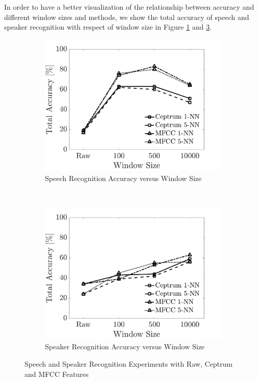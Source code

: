 \documentclass{article}
\begin{document}
	\justify In order to have a better visualization of the relationship between accuracy and different window sizes and methods, we show the total accuracy of speech and speaker recognition with respect of window size in Figure \ref{fig:speech} and \ref{fig:speaker}.
	\begin{figure}[H]
		\centering
		\begin{subfigure}[t]{0.49\textwidth}
			\centering
			\includegraphics[width=\textwidth]{speech_accuracy}
			\caption{Speech Recognition Accuracy versus Window Size}
			\label{fig:speech}
		\end{subfigure}~
		\begin{subfigure}[t]{0.49\textwidth}
			\centering
			\includegraphics[width=\textwidth]{speaker_accuracy}
			\caption{Speaker Recognition Accuracy versus Window Size}
			\label{fig:speaker}
		\end{subfigure}
	
	\caption{Speech and Speaker Recognition Experiments with Raw, Ceptrum and MFCC Features}
		
	\end{figure}
	
\end{document}
